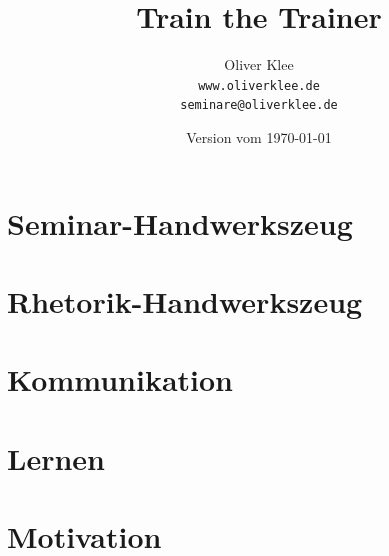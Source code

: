 \documentclass[a4paper,openany,twoside,titlepage,10pt,headsepline]{scrbook}
\title{Train the Trainer}
\author{Oliver Klee\\\texttt{www.oliverklee.de}\\\texttt{seminare@oliverklee.de}}
\date{Version vom \today}
\begin{document}
    \frontmatter

    \maketitle

    \tableofcontents

    \mainmatter


    \chapter{Seminar-Handwerkszeug}
    
    
    
    
    

    

    


    \chapter{Rhetorik-Handwerkszeug}
    
    
    


    \chapter{Kommunikation}
    
    
    
    
    


    \chapter{Lernen}
    

    
    
    
    


    \chapter{Motivation}
    

    


    \backmatter
\end{document}
